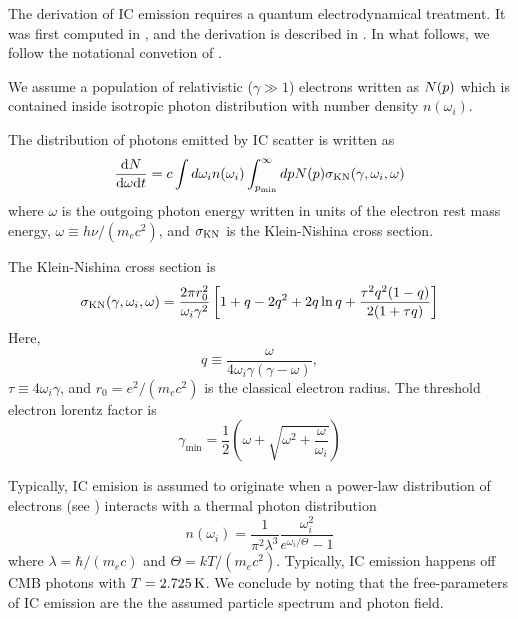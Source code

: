 The derivation of \Ac{IC} emission requires a quantum
electrodynamical treatment. It was first computed in
\cite{klein_1929a_streuung-strahlung}, and the derivation is described
in \cite{blumenthal_1970a_bremsstrahlung-synchrotron}.  In what follows, we follow
the notational convetion of \cite{houck_2006a_models-nonthermal}.

We assume a population of relativistic ($\gamma\gg1$) electrons
written as $N(p)$ which is contained inside isotropic 
photon distribution with number density $n(\omega_i)$.

The distribution of photons 
emitted by \ac{IC} scatter is
written as
\begin{equation}
  \frac{\text{d}N}{\text{d}\omega\text{d}t} = 
  c \int d \omega_i n(\omega_i)
  \int_{p_\text{min}}^\infty  dp
  N(p) 
 \sigma_\text{KN}(\gamma,\omega_i,\omega)
\end{equation}
where $\omega$ is the outgoing photon energy written
in units of the electron rest mass energy, $\omega\equiv h\nu/(m_e c^2)$,
and $\sigma_\text{KN}$ is the Klein-Nishina cross section.

The Klein-Nishina cross section is
\begin{equation}
\sigma_\text{KN}(\gamma,\omega_i,\omega) = \frac{2\pi r_0^2}{\omega_i \gamma^2}
  \left[
  1 + q - 2q^2 + 2q\ln q + \frac{\tau^2 q^2 (1-q)}{2(1+\tau q)}
  \right]
\end{equation}
Here,
\begin{equation}
  q \equiv \frac{\omega}{4 \omega_i \gamma (\gamma-\omega)},
\end{equation}
$\tau \equiv 4\omega_i \gamma$, and $r_0 = e^2/(m_e c^2)$ is the classical
electron radius.
The threshold electron lorentz factor is
\begin{equation}
  \gamma_\text{min} =
  \frac{1}{2} 
  \left(
  \omega + \sqrt{\omega^2 + \frac{\omega}{\omega_i}}
  \right)
\end{equation}

Typically, \ac{IC} emision is assumed to originate when
a power-law distribution of electrons
(see )
interacts with
a thermal photon distribution
\begin{equation}
  n(\omega_i) = 
  \frac{1}{\pi^2\lambda^3} 
  \frac{\omega_i^2}{e^{\omega_i/\Theta} -1}
\end{equation}
where $\lambda=\hbar/(m_e c)$ and $\Theta=kT/(m_e c^2)$.
Typically, \ac{IC} emission happens off CMB photons
with $T=2.725\,\text{K}$.
We conclude by noting that the free-parameters of 
\ac{IC} emission are the the assumed particle spectrum
and photon field.

